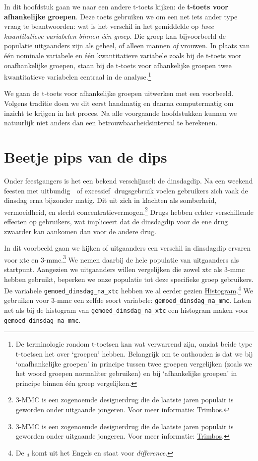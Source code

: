\documentclass[
  letterpaper,
  DIV=11,
  numbers=noendperiod]{scrreprt}
\begin{document}
In dit hoofdstuk gaan we naar een andere t-toets kijken: de
\textbf{t-toets voor afhankelijke groepen}. Deze toets gebruiken we om
een net iets ander type vraag te beantwoorden: wat is het verschil in
het gemiddelde op \emph{twee kwantitatieve variabelen binnen één groep.}
Die groep kan bijvoorbeeld de populatie uitgaanders zijn als geheel, of
alleen mannen \emph{of} vrouwen. In plaats van één nominale variabele en
één kwantitatieve variabele zoals bij de t-toets voor onafhankelijke
groepen, staan bij de t-toets voor afhankelijke groepen twee
kwantitatieve variabelen centraal in de analyse.\footnote{De
  terminologie rondom t-toetsen kan wat verwarrend zijn, omdat beide
  type t-toetsen het over `groepen' hebben. Belangrijk om te onthouden
  is dat we bij `onafhankelijke groepen' in principe tussen twee groepen
  vergelijken (zoals we het woord groepen normaliter gebruiken) en bij
  `afhankelijke groepen' in principe binnen één groep vergelijken.}

We gaan de t-toets voor afhankelijke groepen uitwerken met een
voorbeeld. Volgens traditie doen we dit eerst handmatig en daarna
computermatig om inzicht te krijgen in het proces. Na alle voorgaande
hoofdstukken kunnen we natuurlijk niet anders dan een
betrouwbaarheidsinterval te berekenen.

\section{Beetje pips van de dips}\label{beetje-pips-van-de-dips}

Onder feestgangers is het een bekend verschijnsel: de dinsdagdip. Na een
weekend feesten met uitbundig 🥳 of excessief😬 drugsgebruik voelen
gebruikers zich vaak de dinsdag erna bijzonder matig. Dit uit zich in
klachten als somberheid, vermoeidheid, en slecht
concentratievermogen.\footnote{3-MMC is een zogenoemde designerdrug die
  de laatste jaren populair is geworden onder uitgaande jongeren. Voor
  meer informatie: Trimbos.} Drugs hebben echter verschillende effecten
op gebruikers, wat impliceert dat de dinsdagdip voor de ene drug
zwaarder kan aankomen dan voor de andere drug.

In dit voorbeeld gaan we kijken of uitgaanders een verschil in
dinsdagdip ervaren voor xtc en 3-mmc.\footnote{3-MMC is een zogenoemde
  designerdrug die de laatste jaren populair is geworden onder uitgaande
  jongeren. Voor meer informatie:
  \href{https://www.trimbos.nl/kennis/drugs/informatiepermiddel/3-mmc/}{Trimbos}.}
We nemen daarbij de hele populatie van uitgaanders als startpunt.
Aangezien we uitgaanders willen vergelijken die zowel xtc als 3-mmc
hebben gebruikt, beperken we onze populatie tot deze specifieke groep
gebruikers. De variabele \texttt{gemoed\_dinsdag\_na\_xtc} hebben we al
eerder gezien \hyperref[sec-histogram]{Histogram}.\footnote{De \(_d\)
  komt uit het Engels en staat voor \emph{difference}.} We gebruiken
voor 3-mmc een zelfde soort variabele:
\texttt{gemoed\_dinsdag\_na\_mmc}. Laten net als bij de histogram van
\texttt{gemoed\_dinsdag\_na\_xtc} een histogram maken voor
\texttt{gemoed\_dinsdag\_na\_mmc}.
\end{document}
